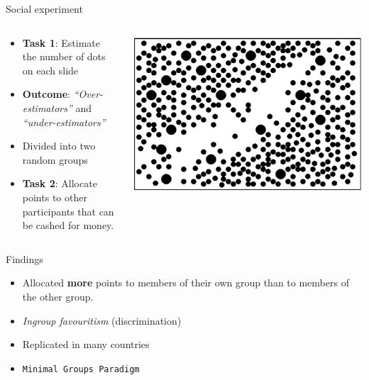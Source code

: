 \documentclass[
  ignorenonframetext,
  aspectratio=169,
]{beamer}
\providecommand{\tightlist}{%
  \setlength{\itemsep}{0pt}\setlength{\parskip}{0pt}}\usepackage{longtable,booktabs,array}
\begin{document}
\begin{frame}{Social experiment}
\label{social-experiment}
\begin{columns}[c,totalwidth=8em]
\begin{column}{0.4\textwidth}
\begin{itemize}[<+->]
\tightlist
\item
  \textbf{Task 1}: Estimate the number of dots on each slide
\item
  \textbf{Outcome}: \emph{``Over-estimators''} and
  \emph{``under-estimators''}
\item
  Divided into two random groups
\item
  \textbf{Task 2}: Allocate points to other participants that can be
  cashed for money.
\end{itemize}
\end{column}

\begin{column}{0.6\textwidth}
\includegraphics{figs/tajfel.png}
\end{column}
\end{columns}
\end{frame}

\begin{frame}[fragile]{Findings}
\label{findings}
\begin{itemize}[<+->]
\tightlist
\item
  Allocated \textbf{more} points to members of their own group than to
  members of the other group.
\item
  \emph{Ingroup favouritism} (discrimination)
\item
  Replicated in many countries
\item
  \texttt{Minimal\ Groups\ Paradigm}
\end{itemize}
\end{frame}
\end{document}
